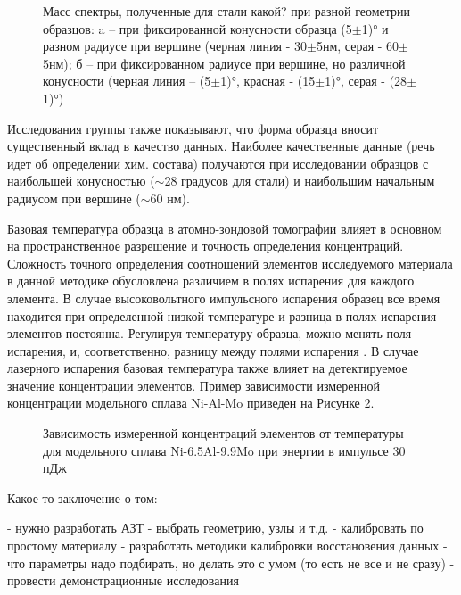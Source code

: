 \begin{figure}[htb]
	\caption{Масс спектры, полученные для стали какой? при разной геометрии образцов: a – при фиксированной конусности образца (5$\pm$1)° и разном радиусе при вершине (черная линия - 30$\pm$5нм, серая - 60$\pm$5нм); б – при фиксированном радиусе при вершине, но различной конусности (черная линия – (5$\pm$1)°, красная - (15$\pm$1)°, серая - (28$\pm$1)°)\cite{Arnoldi12}}
	\label{fig:ParamsGeometry}
\end{figure}

\FloatBarrier

Исследования группы \cite{Arnoldi12} также показывают, что форма образца вносит существенный вклад в качество данных. Наиболее качественные данные (речь идет об определении хим. состава) получаются при исследовании образцов с наибольшей конусностью ($\sim$28 градусов для стали) и наибольшим начальным радиусом при вершине ($\sim$60 нм).

Базовая температура образца в атомно-зондовой томографии влияет в основном на пространственное разрешение \cite{GaultBOOK}  и точность определения концентраций. Сложность точного определения соотношений элементов исследуемого материала в данной методике обусловлена различием в полях испарения для каждого элемента. В случае высоковольтного импульсного испарения образец все время находится при определенной низкой температуре и разница в полях испарения элементов постоянна. Регулируя температуру образца, можно менять поля испарения, и, соответственно, разницу между полями испарения \cite{Wada84}.
В случае лазерного испарения базовая температура также влияет на детектируемое значение концентрации элементов. Пример зависимости измеренной концентрации модельного сплава Ni-Al-Mo приведен на Рисунке \cref{fig:ParamsTemperatureComposition}.

\begin{figure}[htb]
	\caption{Зависимость измеренной концентраций элементов от температуры для модельного сплава Ni-6.5Al-9.9Mo при энергии в импульсе 30 пДж \cite{Tu15}}
	\label{fig:ParamsTemperatureComposition}
\end{figure}

\cite{scbibAPPLEvsATLAS}

\FloatBarrier

Какое-то заключение о том:

- нужно разработать АЗТ
- выбрать геометрию, узлы и т.д.
- калибровать по простому материалу
- разработать методики калибровки восстановения данных
- что параметры надо подбирать, но делать это с умом (то есть не все и не сразу)
- провести демонстрационные исследования


























